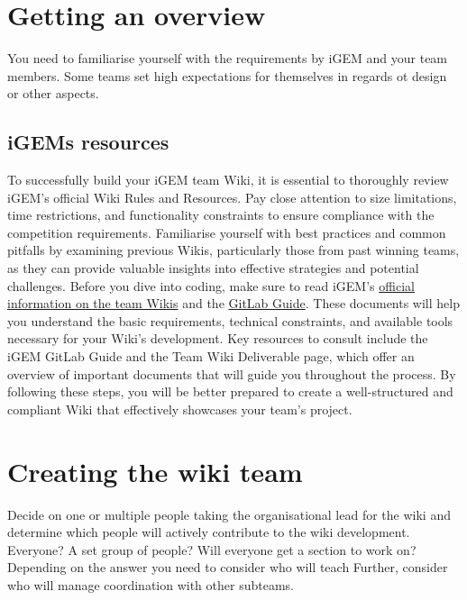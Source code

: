 

    \section{Getting an overview} \label{sec:project-overview}
    You need to familiarise yourself with the requirements by iGEM and your team members.
    Some teams set high expectations for themselves in regards ot design or other aspects.
    \subsection{iGEMs resources} \label{subsec:reading-igem-resources}
    To successfully build your iGEM team Wiki, it is essential to thoroughly review iGEM’s official Wiki Rules and Resources. 
    Pay close attention to size limitations, time restrictions, and functionality constraints to ensure compliance with the competition requirements. 
    Familiarise yourself with best practices and common pitfalls by examining previous Wikis, particularly those from past winning teams, as they can provide valuable insights into effective strategies and potential challenges. \newline
    Before you dive into coding, make sure to read iGEM’s \href{https://competition.igem.org/deliverables/team-Wiki}{official information on the team Wikis} and the \href{https://competition.igem.org/deliverables/gitlab-guide}{GitLab Guide}.
    These documents will help you understand the basic requirements, technical constraints, and available tools necessary for your Wiki's development. 
    Key resources to consult include the iGEM GitLab Guide and the Team Wiki Deliverable page, which offer an overview of important documents that will guide you throughout the process. \newline
    By following these steps, you will be better prepared to create a well-structured and compliant Wiki that effectively showcases your team’s project.

    \section{Creating the wiki team} \label{sec:creating-wiki-team}
    Decide on one or multiple people taking the organisational lead for the wiki and determine which people will
    actively contribute to the wiki development.
    Everyone? A set group of people? Will everyone get a section to work on? \\
    Depending on the answer you need to consider who will teach
    Further, consider who will manage coordination with other subteams.

